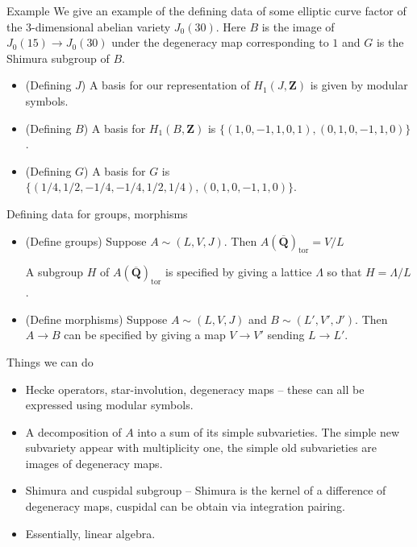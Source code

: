\documentclass{beamer}
\newcommand{\QQbar}{\overline{\mathbf{Q}}}
\newcommand{\ZZ}{\mathbf{Z}}
\renewcommand{\ZZ}{\mathbf{Z}}
\newcommand{\tor}{\mathrm{tor}}
\begin{document}
\begin{frame}{Example}
    We give an example of the defining data of some elliptic curve factor of
    the 3-dimensional abelian variety $J_0(30)$. Here $B$ is the image of
    $J_0(15)\to J_0(30)$ under the degeneracy map corresponding to $1$ and $G$
    is the Shimura subgroup of $B$.
    \begin{itemize}
        \item
            (Defining $J$) A basis for our representation of $H_1(J, \ZZ)$ is
            given by modular symbols.
        \item
            (Defining $B$) A basis for $H_1(B, \ZZ)$ is $\{(1,0,-1,1,0,1),
            (0,1,0,-1,1,0)\}$.
        \item
            (Defining $G$) A basis for $G$ is $\{(1/4, 1/2, -1/4, -1/4, 1/2,
            1/4), (0,1,0,-1,1,0)\}$.
    \end{itemize}
\end{frame}

\begin{frame}{Defining data for groups, morphisms}
    \begin{itemize}
        \item
            (Define groups) Suppose $A\sim (L, V, J)$. Then
            $A(\QQbar)_\tor=V/L$

            A subgroup $H$ of
            $A(\QQbar)_\tor$ is specified by giving a lattice $\Lambda$ so that
            $H = \Lambda/L$.
        \item
            (Define morphisms) Suppose $A\sim (L, V, J)$ and $B\sim (L', V', J')$.
            Then $A\to B$ can be specified by giving a map $V\to V'$ sending
            $L\to L'$.
    \end{itemize}
\end{frame}

\begin{frame}{Things we can do}
    \begin{itemize}
        \item
            Hecke operators, star-involution, degeneracy maps -- these can all
            be expressed using modular symbols.
        \item
            A decomposition of $A$ into a sum of its simple subvarieties. The
            simple new subvariety appear with multiplicity one, the simple old
            subvarieties are images of degeneracy maps.
        \item
            Shimura and cuspidal subgroup -- Shimura is the kernel of a
            difference of degeneracy maps, cuspidal can be obtain via
            integration pairing.
        \item
            Essentially, linear algebra.
    \end{itemize}
\end{frame}
\end{document}
